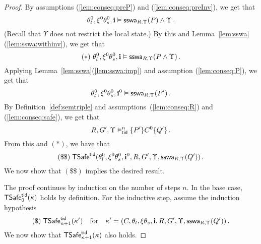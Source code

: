 \begin{proof}
By assumptions (\ref{lem:conseq:preP}) and (\ref{lem:conseq:preInv}), we get that
$$
\theta^0_l,\xi^0\theta^0_s,\intp\vDash \sswa{P}{R}{\Upsilon} \land \Upsilon\,.
$$
(Recall that $\Upsilon$ does not restrict the local state.)
By this and Lemma~\ref{lem:sswa}(\ref{lem:sswa:withinv}), we get that 
$$
(*)~\theta^0_l,\xi^0\theta^0_s,\intp\vDash \sswa{P\land \Upsilon}{R}{\Upsilon} \,.
$$
Applying Lemma~\ref{lem:sswa}(\ref{lem:sswa:imp})
and 
assumption (\ref{lem:conseq:P}),
we get that 
\[
 \theta^0_l,\xi^0\theta^0_s,\intp^0 \vDash \sswa{P'}{R}{\Upsilon}\,.
\]
By Definition~\ref{def:semtriple} and assumptions~(\ref{lem:conseq:R}) and
(\ref{lem:conseq:safe}), we get that
$$
R,G',\Upsilon \vDash^n_{\ltid}  \{ P'\} C^0 \{Q'\}\,.
$$
From this and $(*)$, we have that 
$$
(\$\$) \; \safe(\theta^0_l,\xi^0\theta^0_s,\intp^0,R,G',\Upsilon,\sswa{Q'}{R}{\Upsilon})\,.
$$
We now show that $ (\$\$)$  implies the desired result.


The proof continues by induction on the number of steps $n$.
In the base case, $\safe_0(\kappa)$ holds by definition.
For the inductive step, 
assume 
the induction hypothesis 
$$
(\$) \;\safe_{n+1}(\kappa') \quad \text{for} \quad \kappa' = (C,\theta_l,\xi\theta_s,\intp,R,G',\Upsilon,  \sswa{Q'}{R}{\Upsilon})\,.
$$
%
We now show that $\safe_{n+1}(\kappa)$ also holds.




\end{proof}
